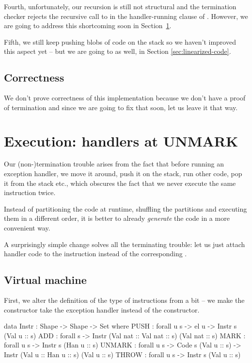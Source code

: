 Fourth, unfortunately, our recursion is still not structural and the
termination checker rejects the recursive call to  in the
handler-running clause of . However, we are going to address
this shortcoming soon in Section~\ref{sec:handlers-at-unmark}.

Fifth, we still keep pushing blobs of code on the stack so we haven't improved
this aspect yet -- but we are going to as well, in Section \ref{sec:linearized-code}.

\subsection{Correctness}

We don't prove correctness of this implementation because we don't
have a proof of termination and since we are going to fix that soon, let us
leave it that way.

\section{Execution: handlers at UNMARK}
\label{sec:handlers-at-unmark}

Our (non-)termination trouble arises from the fact that before running an
exception handler, we move it around, push it on the stack, run other code, pop
it from the stack etc., which obscures the fact that we never execute the same
instruction twice.

Instead of partitioning the code at runtime, shuffling the partitions and
executing them in a different order, it is better to already \emph{generate}
the code in a more convenient way.

A surprisingly simple change solves all the terminating trouble: let us just
attach handler code to the instruction  instead of the
corresponding .

\subsection{Virtual machine}

First, we alter the definition of the type of instructions from
 a bit -- we make the  constructor take
the exception handler instead of the  constructor.

\begin{code}
  data Instr : Shape -> Shape -> Set where
    PUSH : forall {u s} -> el u -> Instr s (Val u :: s)
    ADD : forall {s} -> Instr (Val nat :: Val nat :: s) (Val nat :: s)
    MARK : forall {u s} -> Instr s (Han u :: s)
    UNMARK : forall {u s} -> Code s (Val u :: s)
      -> Instr (Val u :: Han u :: s) (Val u :: s)
    THROW : forall {u s} -> Instr s (Val u :: s)
\end{code}

